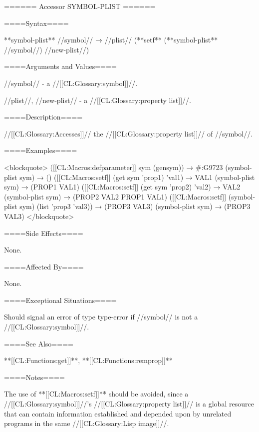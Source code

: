 ====== Accessor SYMBOL-PLIST ======

====Syntax====

**symbol-plist** //symbol// → //plist// (**setf** (**symbol-plist** //symbol//) //new-plist//)

====Arguments and Values====

//symbol// - a //[[CL:Glossary:symbol]]//.

//plist//, //new-plist// - a //[[CL:Glossary:property list]]//.

====Description====

//[[CL:Glossary:Accesses]]// the //[[CL:Glossary:property list]]// of //symbol//.

====Examples====

<blockquote> ([[CL:Macros:defparameter]] sym (gensym)) → #:G9723 (symbol-plist sym) → () ([[CL:Macros:setf]] (get sym 'prop1) 'val1) → VAL1 (symbol-plist sym) → (PROP1 VAL1) ([[CL:Macros:setf]] (get sym 'prop2) 'val2) → VAL2 (symbol-plist sym) → (PROP2 VAL2 PROP1 VAL1) ([[CL:Macros:setf]] (symbol-plist sym) (list 'prop3 'val3)) → (PROP3 VAL3) (symbol-plist sym) → (PROP3 VAL3) </blockquote>

====Side Effects====

None.

====Affected By====

None.

====Exceptional Situations====

Should signal an error of type type-error if //symbol// is not a //[[CL:Glossary:symbol]]//.

====See Also====

**[[CL:Functions:get]]**, **[[CL:Functions:remprop]]**

====Notes====

The use of **[[CL:Macros:setf]]** should be avoided, since a //[[CL:Glossary:symbol]]//'s //[[CL:Glossary:property list]]// is a global resource that can contain information established and depended upon by unrelated programs in the same //[[CL:Glossary:Lisp image]]//.

